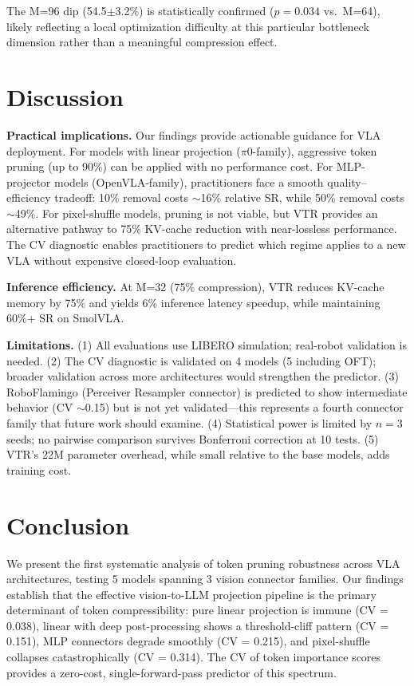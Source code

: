 \documentclass[letterpaper]{article}
\begin{document}
The M=96 dip (54.5$\pm$3.2\%) is statistically confirmed ($p = 0.034$ vs.\ M=64), likely reflecting a local optimization difficulty at this particular bottleneck dimension rather than a meaningful compression effect.

\section{Discussion}

\textbf{Practical implications.} Our findings provide actionable guidance for VLA deployment. For models with linear projection ($\pi$0-family), aggressive token pruning (up to 90\%) can be applied with no performance cost. For MLP-projector models (OpenVLA-family), practitioners face a smooth quality--efficiency tradeoff: 10\% removal costs $\sim$16\% relative SR, while 50\% removal costs $\sim$49\%. For pixel-shuffle models, pruning is not viable, but VTR provides an alternative pathway to 75\% KV-cache reduction with near-lossless performance. The CV diagnostic enables practitioners to predict which regime applies to a new VLA without expensive closed-loop evaluation.

\textbf{Inference efficiency.} At M=32 (75\% compression), VTR reduces KV-cache memory by 75\% and yields 6\% inference latency speedup, while maintaining 60\%+ SR on SmolVLA.

\textbf{Limitations.} (1) All evaluations use LIBERO simulation; real-robot validation is needed. (2) The CV diagnostic is validated on 4 models (5 including OFT); broader validation across more architectures would strengthen the predictor. (3) RoboFlamingo (Perceiver Resampler connector) is predicted to show intermediate behavior (CV $\sim$0.15) but is not yet validated---this represents a fourth connector family that future work should examine. (4) Statistical power is limited by $n=3$ seeds; no pairwise comparison survives Bonferroni correction at 10 tests. (5) VTR's 22M parameter overhead, while small relative to the base models, adds training cost.

\section{Conclusion}

We present the first systematic analysis of token pruning robustness across VLA architectures, testing 5 models spanning 3 vision connector families. Our findings establish that the effective vision-to-LLM projection pipeline is the primary determinant of token compressibility: pure linear projection is immune (CV = 0.038), linear with deep post-processing shows a threshold-cliff pattern (CV = 0.151), MLP connectors degrade smoothly (CV = 0.215), and pixel-shuffle collapses catastrophically (CV = 0.314). The CV of token importance scores provides a zero-cost, single-forward-pass predictor of this spectrum.
\end{document}
